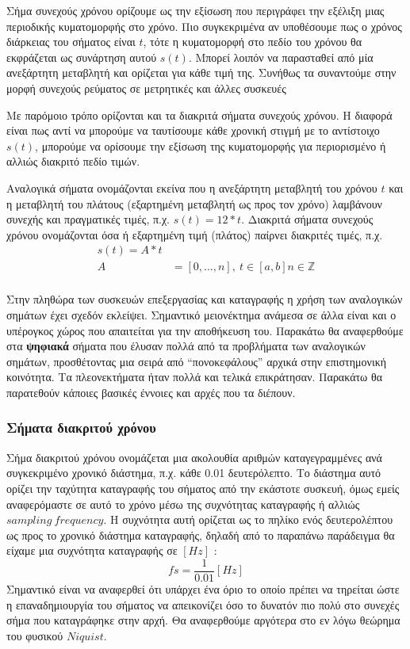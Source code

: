 \documentclass[breaklines=true, 12pt]{article}
\begin{document}
Σήμα συνεχούς χρόνου ορίζουμε ως την εξίσωση που
περιγράφει την εξέλιξη μιας περιοδικής κυματομορφής στο χρόνο. Πιο συγκεκριμένα
αν υποθέσουμε πως ο χρόνος διάρκειας του σήματος είναι \(t\), τότε η κυματομορφή στο
πεδίο του χρόνου θα εκφράζεται ως συνάρτηση αυτού \(s(t)\).
Μπορεί λοιπόν να παρασταθεί από μία ανεξάρτητη μεταβλητή και ορίζεται για κάθε
τιμή της. Συνήθως τα συναντούμε στην μορφή συνεχούς ρεύματος σε μετρητικές
και άλλες συσκευές

Με παρόμοιο τρόπο ορίζονται και τα διακριτά σήματα συνεχούς χρόνου.
Η διαφορά είναι πως αντί να μπορούμε να ταυτίσουμε κάθε χρονική στιγμή με το
αντίστοιχο \(s(t)\), μπορούμε να ορίσουμε την εξίσωση της κυματομορφής για
περιορισμένο ή αλλιώς διακριτό πεδίο τιμών.

Αναλογικά σήματα ονομάζονται εκείνα που η ανεξάρτητη μεταβλητή του
χρόνου \(t\) και η μεταβλητή του πλάτους (εξαρτημένη μεταβλητή ως προς τον
χρόνο) λαμβάνουν συνεχής και πραγματικές τιμές, π.χ. \(s(t) = 12 * t\).
Διακριτά σήματα συνεχούς χρόνου ονομάζονται όσα ή εξαρτημένη τιμή
(πλάτος) παίρνει διακριτές τιμές, π.χ.
\begin{equation}
\begin{align}
s(t) =  A * t \\
A &= [0, … ,n],\ t \in [a,b] n \in \mathbb{Z} \\
\end{align}
\end{equation}

Στην πληθώρα των συσκευών επεξεργασίας και καταγραφής η χρήση
των αναλογικών σημάτων έχει σχεδόν εκλείψει. Σημαντικό μειονέκτημα
ανάμεσα σε άλλα είναι και ο υπέρογκος χώρος που απαιτείται
για την αποθήκευση του. Παρακάτω θα αναφερθούμε στα \textbf{ψηφιακά} σήματα που
έλυσαν πολλά από τα προβλήματα των αναλογικών σημάτων, προσθέτοντας μια
σειρά από “πονοκεφάλους” αρχικά στην επιστημονική κοινότητα. Τα
πλεονεκτήματα ήταν πολλά και τελικά επικράτησαν. Παρακάτω θα παρατεθούν
κάποιες βασικές έννοιες και αρχές που τα διέπουν.
\subsubsection{Σήματα διακριτού χρόνου}
\label{sec:orgd6757c9}
Σήμα διακριτού χρόνου ονομάζεται μια ακολουθία αριθμών καταγεγραμμένες
ανά συγκεκριμένο χρονικό διάστημα, π.χ. κάθε 0.01 δευτερόλεπτο. Το
διάστημα αυτό ορίζει την ταχύτητα καταγραφής του σήματος από την
εκάστοτε συσκευή, όμως εμείς αναφερόμαστε σε αυτό το χρόνο μέσω της
συχνότητας καταγραφής ή αλλιώς \({sampling\ frequency}\). Η συχνότητα αυτή
ορίζεται ως το πηλίκο ενός δευτερολέπτου ως προς το χρονικό διάστημα
καταγραφής, δηλαδή από το παραπάνω παράδειγμα θα είχαμε μια συχνότητα
καταγραφής σε \([Hz]\) :
\begin{equation}
fs = \frac{1}{0.01} [Hz]
\end{equation}
Σημαντικό είναι να αναφερθεί ότι υπάρχει ένα όριο το οποίο πρέπει να
τηρείται ώστε η επαναδημιουργία του σήματος να απεικονίζει όσο το
δυνατόν πιο πολύ στο συνεχές σήμα που καταγράφηκε στην αρχή. Θα
αναφερθούμε αργότερα στο εν λόγω θεώρημα του φυσικού \({Niquist}\).
\end{document}

